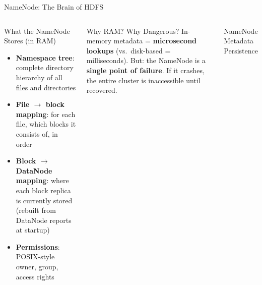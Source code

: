 \documentclass[aspectratio=169,10pt]{beamer}
\begin{document}
\begin{frame}{NameNode: The Brain of HDFS}
  \begin{columns}[T]
      \begin{block}{What the NameNode Stores (in RAM)}
        \begin{itemize}
          \item \textbf{Namespace tree}: complete directory hierarchy of all files and directories
          \item \textbf{File $\to$ block mapping}: for each file, which blocks it consists of, in order
          \item \textbf{Block $\to$ DataNode mapping}: where each block replica is currently stored (rebuilt from DataNode reports at startup)
          \item \textbf{Permissions}: POSIX-style owner, group, access rights
        \end{itemize}
      \end{block}
      \vspace{4pt}
      \begin{alertblock}{Why RAM? Why Dangerous?}
        In-memory metadata = \textbf{microsecond lookups} (vs.\ disk-based = milliseconds).  But: the NameNode is a \textbf{single point of failure}.  If it crashes, the entire cluster is inaccessible until recovered.
      \end{alertblock}

      \begin{exampleblock}{NameNode Metadata Persistence}
        \begin{center}
\end{center}
\end{exampleblock}
\end{columns}
\end{frame}
\end{document}

